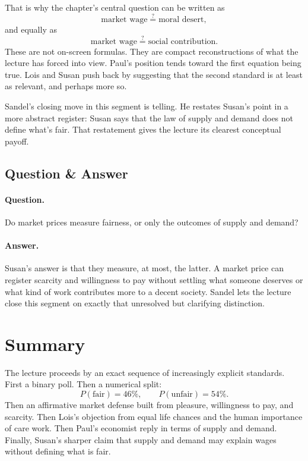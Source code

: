 That is why the chapter's central question can be written as
\begin{equation}
\text{market wage}
\stackrel{?}{=}
\text{moral desert},
\end{equation}
and equally as
\begin{equation}
\text{market wage}
\stackrel{?}{=}
\text{social contribution}.
\end{equation}
These are not on-screen formulas. They are compact reconstructions of what the lecture has forced into view. Paul's position tends toward the first equation being true. Lois and Susan push back by suggesting that the second standard is at least as relevant, and perhaps more so.

Sandel's closing move in this segment is telling. He restates Susan's point in a more abstract register: Susan says that the law of supply and demand does not define what's fair. That restatement gives the lecture its clearest conceptual payoff.

\subsection{Question \& Answer}

\paragraph{Question.} Do market prices measure fairness, or only the outcomes of supply and demand?

\paragraph{Answer.} Susan's answer is that they measure, at most, the latter. A market price can register scarcity and willingness to pay without settling what someone deserves or what kind of work contributes more to a decent society. Sandel lets the lecture close this segment on exactly that unresolved but clarifying distinction.

\section{Summary}

The lecture proceeds by an exact sequence of increasingly explicit standards. First a binary poll. Then a numerical split:
\begin{equation}
P(\text{fair}) = 46\%, \qquad P(\text{unfair}) = 54\%.
\end{equation}
Then an affirmative market defense built from pleasure, willingness to pay, and scarcity. Then Lois's objection from equal life chances and the human importance of care work. Then Paul's economist reply in terms of supply and demand. Finally, Susan's sharper claim that supply and demand may explain wages without defining what is fair.

